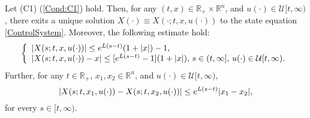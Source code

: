     \begin{proposition}\label{prop2.1.1}
        Let (C1) (\ref{Cond:C1}) hold. Then, for any $(t,x)\in\mathbb{R}_{+}%
        \times\mathbb{R}^n$, and $u(\cdot)\in \mathcal{U}[t,\infty)$, there 
        exits a unique solution $X(\cdot)\equiv X(\cdot;t,x,u(\cdot))$ to the 
        state equation \cref{ControlSystem}. Moreover, the following estimate 
        hold:
        \begin{equation}\label{eq2.2}
            \left\{ 
            \begin{array}{l}
                \abs{X(s;t,x,u(\cdot))} \leq e^{L(s-t)}(1+|x|)-1, \\
                    \abs{X(s;t,x,u(\cdot))-x}\leq [e^{L(s-t)}-1](1+|x|),\, %
                s\in (t,\infty],\, u(\cdot)\in \mathcal{U}[t,\infty).\\
            \end{array}
            \right.
        \end{equation} 
        Further, for any $t\in \mathbb{R}_{+}$, $x_1,x_2\in \mathbb{R}^n$, and 
        $u(\cdot)\in \mathcal{U}[t,\infty)$,
        \begin{equation}\label{eq2.3}
            \left\lvert X(s;t,x_1,u(\cdot))-X(s;t,x_2,u(\cdot))\right\rvert \leq e^{L(s-t)}|x_1-x_2|,
        \end{equation}
        for every $s\in [t,\infty)$.
    \end{proposition}
